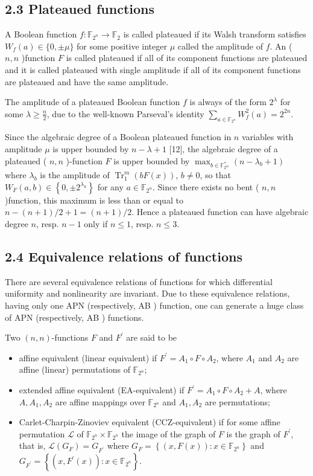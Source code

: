 \documentclass[10pt]{article}
\begin{document}
\subsection*{2.3 Plateaued functions}
A Boolean function $f: \mathbb{F}_{2^{n}} \rightarrow \mathbb{F}_{2}$ is called plateaued if its Walsh transform satisfies $W_{f}(a) \in\{0, \pm \mu\}$ for some positive integer $\mu$ called the amplitude of $f$. An ( $n, n$ )function $F$ is called plateaued if all of its component functions are plateaued and it is called plateaued with single amplitude if all of its component functions are plateaued and have the same amplitude.

The amplitude of a plateaued Boolean function $f$ is always of the form $2^{\lambda}$ for some $\lambda \geq \frac{n}{2}$, due to the well-known Parseval's identity $\sum_{a \in \mathbb{F}_{2^{n}}} W_{f}^{2}(a)=2^{2 n}$.

Since the algebraic degree of a Boolean plateaued function in $n$ variables with amplitude $\mu$ is upper bounded by $n-\lambda+1$ [12], the algebraic degree of a plateaued ( $n, n$ )-function $F$ is upper bounded by $\max _{b \in \mathbb{F}_{2^{m}}^{*}}\left(n-\lambda_{b}+1\right)$ where $\lambda_{b}$ is the amplitude of $\operatorname{Tr}_{1}^{m}(b F(x))$, $b \neq 0$, so that $W_{F}(a, b) \in\left\{0, \pm 2^{\lambda_{u}}\right\}$ for any $a \in \mathbb{F}_{2^{n}}$. Since there exists no bent ( $n, n$ )function, this maximum is less than or equal to $n-(n+1) / 2+1=(n+1) / 2$. Hence a plateaued function can have algebraic degree $n$, resp. $n-1$ only if $n \leq 1$, resp. $n \leq 3$.

\subsection*{2.4 Equivalence relations of functions}
There are several equivalence relations of functions for which differential uniformity and nonlinearity are invariant. Due to these equivalence relations, having only one APN (respectively, AB ) function, one can generate a huge class of APN (respectively, AB ) functions.

Two $(n, n)$-functions $F$ and $F^{\prime}$ are said to be

\begin{itemize}
  \item affine equivalent (linear equivalent) if $F^{\prime}=A_{1} \circ F \circ A_{2}$, where $A_{1}$ and $A_{2}$ are affine (linear) permutations of $\mathbb{F}_{2^{n}}$;
  \item extended affine equivalent (EA-equivalent) if $F^{\prime}=A_{1} \circ F \circ A_{2}+A$, where $A, A_{1}, A_{2}$ are affine mappings over $\mathbb{F}_{2^{n}}$ and $A_{1}, A_{2}$ are permutations;
  \item Carlet-Charpin-Zinoviev equivalent (CCZ-equivalent) if for some affine permutation $\mathcal{L}$ of $\mathbb{F}_{2^{n}} \times \mathbb{F}_{2^{n}}$ the image of the graph of $F$ is the graph of $F^{\prime}$, that is, $\mathcal{L}\left(G_{F}\right)=G_{F^{\prime}}$ where $G_{F}=\left\{(x, F(x)): x \in \mathbb{F}_{2^{n}}\right\}$ and $G_{F^{\prime}}=\left\{\left(x, F^{\prime}(x)\right): x \in \mathbb{F}_{2^{n}}\right\}$.
\end{itemize}
\end{document}
